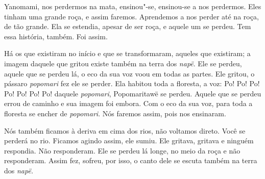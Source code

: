  

 Yanomami, nos perdermos na mata, ensinou"-se,
ensinou-se a nos perdermos. Eles tinham uma grande roça, e assim faremos.
Aprendemos a nos perder até na roça, de tão grande. Ela se estendia, apesar
de ser roça, e aquele um se perdeu. Tem essa história, também. Foi assim. 

Há os que existiram no início e que se transformaram, aqueles que
existiram; a imagem daquele que gritou existe também na terra
dos \emph{napë}. Ele se perdeu, aquele que se perdeu lá, o eco da sua
voz voou em todas as partes. Ele gritou, o pássaro \emph{popomari} fez
ele se perder. Ela habitou toda a floresta, a voz: Po! Po! Po! Po! Po!
Po! Po! daquele \emph{popomari}, Popomaritawë se perdeu. Aquele que se
perdeu errou de caminho e sua imagem foi embora. Com o eco da sua voz,
para toda a floresta se encher de \emph{popomari}. Nós faremos assim,
pois nos ensinaram. 

Nós também ficamos à deriva em cima dos rios, não voltamos direto. Você se
perderá no rio. Ficamos agindo assim, ele sumiu. Ele gritava, gritava e
ninguém respondia. Não responderam. Ele se perdeu lá longe, no meio da
roça e não responderam. Assim fez, sofreu, por isso, o canto dele se
escuta também na terra dos \emph{napë.}
